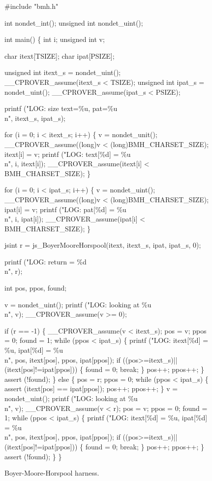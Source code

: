 \documentclass[conference]{IEEEtran}
\begin{document}
\begin{figure}
{\scriptsize
\begin{code}
\#include "bmh.h"

int nondet\_int();
unsigned int nondet\_uint();

int main() \{
  int i;
  unsigned int v;

  char itext[TSIZE];
  char ipat[PSIZE];

  unsigned int itext\_s = nondet\_uint();
  \_\_CPROVER\_assume(itext\_s < TSIZE);
  unsigned int ipat\_s = nondet\_uint();
  \_\_CPROVER\_assume(ipat\_s < PSIZE);

  printf ("LOG: size text=\%u, pat=\%u\\n", itext\_s, ipat\_s);

  for (i = 0; i < itext\_s; i++) \{
    v = nondet\_unit();
    \_\_CPROVER\_assume((long)v < (long)BMH\_CHARSET\_SIZE);
    itext[i] = v;
    printf ("LOG: text[\%d] = \%u\\n", i, itext[i]);
    \_\_CPROVER\_assume(itext[i] < BMH\_CHARSET\_SIZE);
  \}

  for (i = 0; i < ipat\_s; i++) \{
    v = nondet\_uint();
    \_\_CPROVER\_assume((long)v < (long)BMH\_CHARSET\_SIZE);
    ipat[i] = v;
    printf ("LOG: pat[\%d] = \%u\\n", i, ipat[i]);
    \_\_CPROVER\_assume(ipat[i] < BMH\_CHARSET\_SIZE);
  \}

  jsint r = js\_BoyerMooreHorspool(itext, itext\_s, 
                ipat, ipat\_s, 0);

  printf ("LOG: return = \%d\\n", r);
  
  int pos, ppos, found;

  v = nondet\_uint();
  printf ("LOG: looking at \%u\\n", v);
  \_\_CPROVER\_assume(v >= 0);
  
  if (r == -1) \{
    \_\_CPROVER\_assume(v < itext\_s);
    pos = v; ppos = 0; found = 1;
    while (ppos < ipat\_s) \{
      printf ("LOG: itext[\%d] = \%u, ipat[\%d] = \%u\\n",
                 pos, itext[pos], ppos, ipat[ppos]);      
      if ((pos>=itext\_s)||(itext[pos]!=ipat[ppos])) \{
	found = 0;
	break;
      \}
      pos++; ppos++;
    \}
    assert (!found);
  \} else \{
    pos = r; ppos = 0;
    while (ppos < ipat\_s) \{
      assert (itext[pos] == ipat[ppos]);
      pos++; ppos++;
    \}
    v = nondet\_uint();
    printf ("LOG: looking at \%u\\n", v);
    \_\_CPROVER\_assume(v < r);
    pos = v; ppos = 0; found = 1;
    while (ppos < ipat\_s) \{
      printf ("LOG: itext[\%d] = \%u, ipat[\%d] = \%u\\n",
                 pos, itext[pos], ppos, ipat[ppos]);
      if ((pos>=itext\_s)||(itext[pos]!=ipat[ppos])) \{
	found = 0;
	break;
      \}
      pos++; ppos++;
    \}
    assert (!found);
  \}
\}
\end{code}
}
\caption{Boyer-Moore-Horspool harness.}
\label{fig:bmhharn}
\end{figure}
\end{document}
